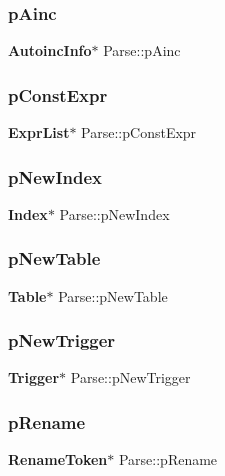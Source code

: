 \mbox{\label{struct_parse_a23de0e2b2dc60ac5f5932c5b2cd34f10}} 
\subsubsection{pAinc}
{\footnotesize\ttfamily \textbf{ Autoinc\+Info}$\ast$ Parse\+::p\+Ainc}

\mbox{\label{struct_parse_ab908ea67b6ac078ee3836fb8bf243002}} 
\subsubsection{pConstExpr}
{\footnotesize\ttfamily \textbf{ Expr\+List}$\ast$ Parse\+::p\+Const\+Expr}

\mbox{\label{struct_parse_adbc2b0a704e2a27dae3ee54542916a70}} 
\subsubsection{pNewIndex}
{\footnotesize\ttfamily \textbf{ Index}$\ast$ Parse\+::p\+New\+Index}

\mbox{\label{struct_parse_a4788769c077dc86ffa3ee1e40ed6b4a1}} 
\subsubsection{pNewTable}
{\footnotesize\ttfamily \textbf{ Table}$\ast$ Parse\+::p\+New\+Table}

\mbox{\label{struct_parse_a92ea8f2ac3190dd7c8360e0334ae78b3}} 
\subsubsection{pNewTrigger}
{\footnotesize\ttfamily \textbf{ Trigger}$\ast$ Parse\+::p\+New\+Trigger}

\mbox{\label{struct_parse_a9e84b7014b4e62bc2db78c6530c2df60}} 
\subsubsection{pRename}
{\footnotesize\ttfamily \textbf{ Rename\+Token}$\ast$ Parse\+::p\+Rename}


